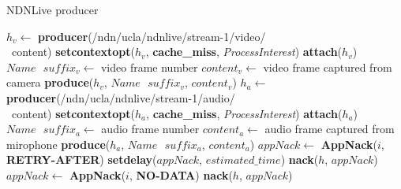 \begin{algorithm}[ht]
\caption{NDNLive producer}
\label{alg:liveproducer}
\begin{algorithmic}[1]
\State $h_v \leftarrow $ \textbf{producer}(/ndn/ucla/ndnlive/stream-1/video/ \\\ content)
\State \textbf{setcontextopt}($h_v$, \textbf{cache\_miss}, \textit{ProcessInterest})
\State \textbf{attach}($h_v$)
\vspace{0.2cm}
	\State $Name \textbf{ } suffix_v \leftarrow $ video frame number
	\State $content_v \leftarrow $ video frame captured from camera
	\State \textbf{produce}($h_v$, $Name\textbf{ }suffix_v$, $content_v$)
	\EndWhile
\vspace{0.2cm}
\vspace{0.2cm}
\State $h_a \leftarrow $ \textbf{producer}(/ndn/ucla/ndnlive/stream-1/audio/ \\\  content)
\State \textbf{setcontextopt}($h_a$, \textbf{cache\_miss}, \textit{ProcessInterest})
\State \textbf{attach}($h_a$)
\vspace{0.2cm}
	\State $Name \textbf{ } suffix_a \leftarrow $ audio frame number
	\State $content_a \leftarrow $ audio frame captured from mirophone
	\State \textbf{produce}($h_a$, $Name\textbf{ }suffix_a$, $content_a$)
	\EndWhile
\vspace{0.4cm}
    \State $appNack \leftarrow $ \textbf{AppNack}($i$, \textbf{RETRY-AFTER})
    \State \textbf{setdelay}($appNack$, $estimated\_time$)
    \State \textbf{nack}($h$, $appNack$)
  \EndIf
    \State $appNack \leftarrow $ \textbf{AppNack}($i$, \textbf{NO-DATA})
    \State \textbf{nack}($h$, $appNack$)
  \EndIf
\EndFunction
\end{algorithmic}
\end{algorithm}

